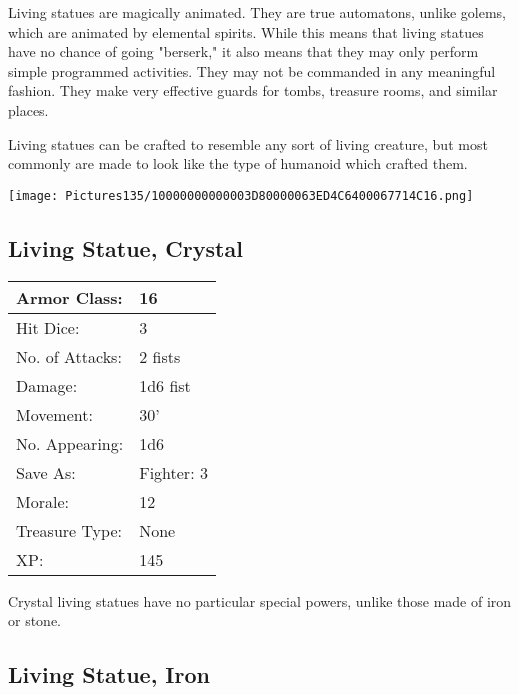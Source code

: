 \documentclass[a4paper,twoside,openany,10pt]{book}
\begin{document}
\begin{multicols}{2}
Living statues are magically animated. They are true automatons, unlike golems, which are animated by elemental spirits. While this means that living statues have no chance of going "berserk," it also means that they may only perform simple programmed activities. They may not be commanded in any meaningful fashion. They make very effective guards for tombs, treasure rooms, and similar places.

Living statues can be crafted to resemble any sort of living creature, but most commonly are made to look like the type of humanoid which crafted them.

\vfill

\begin{center} \texttt{[image: Pictures135/10000000000003D80000063ED4C6400067714C16.png]} \end{center}

\columnbreak


\subsection*{Living Statue, Crystal}\label{living-statue-crystal}

\begin{tabularx}{0.50\textwidth}{@{}lX@{}}
Armor Class: & 16 \\\hline
Hit Dice: & 3 \\\hline
No. of Attacks: & 2 fists \\\hline
Damage: & 1d6 fist \\\hline
Movement: & 30' \\\hline
No. Appearing: & 1d6 \\\hline
Save As: & Fighter: 3 \\\hline
Morale: & 12 \\\hline
Treasure Type: & None \\\hline
XP: & 145 \\\hline
\end{tabularx}\medskip

Crystal living statues have no particular special powers, unlike those made of iron or stone.

\subsection*{Living Statue, Iron}\label{living-statue-iron}


\end{multicols}
\end{document}
